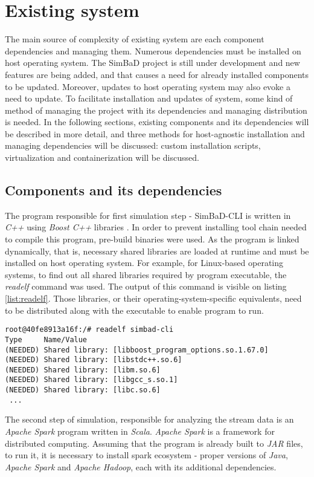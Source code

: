 \chapter{Existing system}
The main source of complexity of existing system are each component dependencies and managing them. Numerous dependencies must be installed on host operating system. The SimBaD project is still under development and new features are being added, and that causes a need for already installed components to be updated. Moreover, updates to host operating system may also evoke a need to update. To facilitate installation and updates of system, some kind of method of managing the project with its dependencies and managing distribution is needed. In the following sections, existing components and its dependencies will be described in more detail, and three methods for host-agnostic installation and managing dependencies will be discussed: custom installation scripts, virtualization and containerization  will be discussed.
\section{Components and its dependencies}
 The program responsible for first simulation step - SimBaD-CLI is written in \textit{C++} using \textit{Boost C++} libraries \cite{Schling2011}. In order to prevent installing tool chain needed to compile this program, pre-build binaries were used. As the program is linked dynamically, that is, necessary shared libraries are loaded at runtime and must be installed on host operating system. For example, for Linux-based operating systems, to find out all shared libraries required by program executable, the \textit{readelf} command was used. The output of this command is visible on listing \ref{list:readelf}. Those libraries, or their operating-system-specific equivalents, need to be distributed along with the executable to enable program to run. 
\begin{lstlisting}[label=list:readelf,caption=The output of readelf command (Tag column ommited), basicstyle=\footnotesize\ttfamily]
root@40fe8913a16f:/# readelf simbad-cli 
Type     Name/Value
(NEEDED) Shared library: [libboost_program_options.so.1.67.0]
(NEEDED) Shared library: [libstdc++.so.6]
(NEEDED) Shared library: [libm.so.6]
(NEEDED) Shared library: [libgcc_s.so.1]
(NEEDED) Shared library: [libc.so.6]
 ...
\end{lstlisting}

The second step of simulation, responsible for analyzing the stream data is an \textit{Apache Spark} program written in \textit{Scala}. \textit{Apache Spark} is a framework for distributed computing. Assuming that the program is already built to \textit{JAR} files, to run it, it is necessary to install spark ecosystem - proper versions of \textit{Java}, \textit{Apache Spark} and \textit{Apache Hadoop}, each with its additional dependencies.

